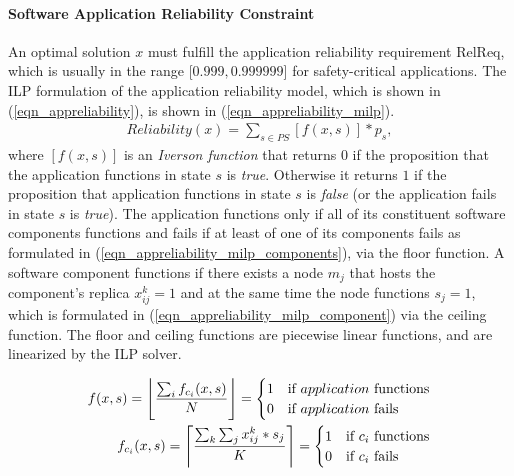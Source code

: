 \paragraph{Software Application Reliability Constraint}
An optimal solution $x$ must fulfill the application reliability requirement RelReq, which is usually in the range [$0.999, 0.999999$] for safety-critical applications. The ILP formulation of the application reliability model, which is shown in (\ref{eqn_appreliability}), is shown in (\ref{eqn_appreliability_milp}).
\begin{align}
\label{eqn_appreliability_milp}
Reliability(x)=\sum_{s\in PS}[f(x,s)]*p_s,
\end{align}
where $[f(x,s)]$ is an \textit{Iverson function } that returns $0$ if the proposition that the application functions in state $s$ is \textit{true}. Otherwise it returns $1$ if the proposition that application functions in state $s$ is \textit{false} (or the application fails in state $s$ is \textit{true}). The application functions only if all of its constituent software components functions and fails if at least of one of its components fails as formulated in (\ref{eqn_appreliability_milp_components}), via the floor function. A software component functions if there exists a node $m_j$ that hosts the component's replica $x_{ij}^k=1$ and at the same time the node functions $s_{j}=1$, which is formulated in (\ref{eqn_appreliability_milp_component}) via the ceiling function. The floor and ceiling functions are piecewise linear functions, and are linearized by the ILP solver.

\begin{align}
f(x,s) = \floor[\Bigg]{\frac{\sum_if_{c_i}(x,s)}{N}}=
\begin{cases}
1 & \mbox{if } application \mbox{ functions}\\
0 & \mbox{if } application \mbox{ fails}
\end{cases}\label{eqn_appreliability_milp_components}\\
f_{c_i}(x,s) = \ceil[\Bigg]{\frac{\sum_k\sum_j x^{k}_{ij}*s_j}{K}}=
\begin{cases}
1 & \mbox{if } c_i \mbox{ functions}\\
0 & \mbox{if } c_i \mbox{ fails}
\end{cases}\label{eqn_appreliability_milp_component}
\end{align}

